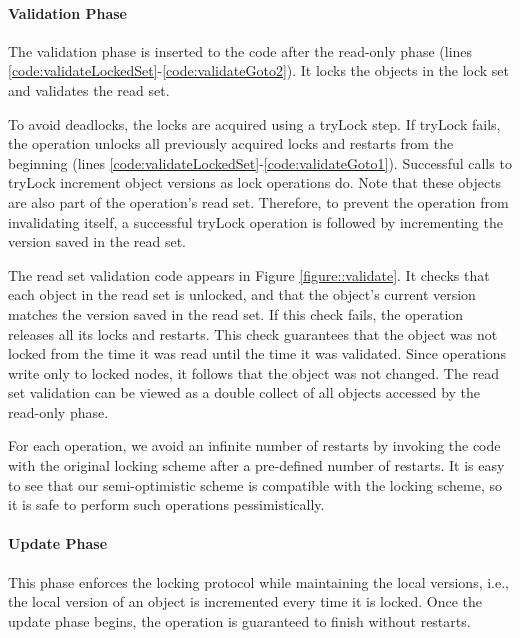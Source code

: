   

\paragraph{Validation Phase} 
The validation phase is inserted to the code after
the read-only phase (lines
\ref{code:validateLockedSet}-\ref{code:validateGoto2}). 
It locks the objects in the lock set and validates the read set. 

To avoid deadlocks, the locks are acquired using a tryLock
step. If tryLock fails, the operation unlocks  all
previously acquired locks and restarts from the beginning 
(lines \ref{code:validateLockedSet}-\ref{code:validateGoto1}). 
Successful calls to tryLock increment object versions as lock operations do.
Note that these objects are also part of the 
operation's read set. Therefore, to prevent the operation from invalidating itself, 
a successful tryLock operation is followed by incrementing
the version saved in the read set.  

The read set validation code appears in Figure \ref{figure::validate}. 
It checks that each object in the read set is unlocked, 
and that the object's current version matches the version saved in the 
read set. If this check fails, the operation releases all its
locks and restarts. This check guarantees
that the object was not locked from the time it was read until
the time it was validated. Since operations write only to
locked nodes, it follows that the object was not changed.  
The read set validation can be viewed as a double collect 
of all objects accessed by the read-only phase. 


For each operation, we avoid an infinite number of restarts by invoking the code
with the original locking scheme after a pre-defined number of restarts.  
It is easy to see that our semi-optimistic scheme is compatible with the
locking scheme, so it is safe to perform such operations pessimistically.


  
\paragraph{Update Phase} 
This phase enforces the locking protocol
  while maintaining the local versions, i.e., the local version of 
  an object is incremented every time it is locked.  
  Once the update phase begins, the operation is guaranteed to 
  finish without restarts.  


